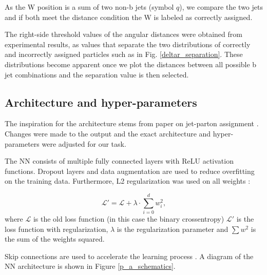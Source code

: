 \documentclass{ctuthesis}
\begin{document}
As the W position is a sum of two non-b jets (symbol $q$), we compare the two jets and if both meet the distance condition the W is labeled as correctly assigned.

The right-side threshold values of the angular distances were obtained from experimental results, as values that separate the two distributions of correctly and incorrectly assigned particles such as in Fig. \ref{deltar_separation}. These distributions become apparent once we plot the distances between all possible b jet combinations and the separation value is then selected.

\begin{figure}[h]
\end{figure}

\subsection{Architecture and hyper-parameters}
\label{sec:pa_architecture}
The inspiration for the architecture stems from paper on jet-parton assignment \cite{parton_assignment}. Changes were made to the output and the exact architecture and hyper-parameters were adjusted for our task. 

 The NN consists of multiple fully connected layers with ReLU activation functions. Dropout layers and data augmentation are used to reduce overfitting on the training data. Furthermore, L2 regularization was used on all weights \cite[p.182]{data_augmentation}:

\begin{equation}
    \mathcal{L}' = \mathcal{L} + \lambda \cdot \sum_{i=0}^{d} w_i^2,    
\end{equation}
where $\mathcal{L}$ is the old loss function (in this case the binary crossentropy) $\mathcal{L}'$ is the loss function with regularization, $\lambda$ is the regularization parameter and $\sum w^2$ is the sum of the weights squared. 
 
 Skip connections are used to accelerate the learning process \cite{parton_assignment}. A diagram of the NN architecture is shown in Figure \ref{p_a_schematics}.
\end{document}
